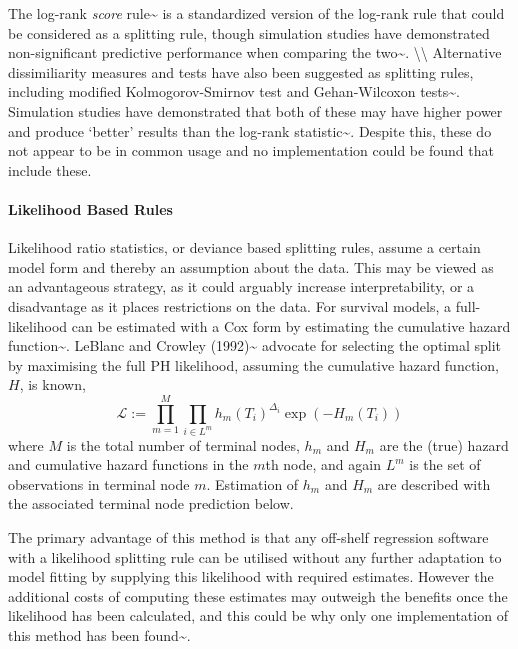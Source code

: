 \documentclass[
  letterpaper,
]{scrbook}
\let\oldparagraph\paragraph
\renewcommand{\paragraph}[1]{\oldparagraph{#1}\mbox{}}
\theoremstyle{plain}
\theoremstyle{definition}
\theoremstyle{remark}
\begin{document}
The log-rank \emph{score} rule\textasciitilde{}\cite{Hothorn2003} is a
standardized version of the log-rank rule that could be considered as a
splitting rule, though simulation studies have demonstrated
non-significant predictive performance when comparing the
two\textasciitilde{}\cite{Ishwaran2008}. \textbackslash\textbackslash{}
Alternative dissimiliarity measures and tests have also been suggested
as splitting rules, including modified Kolmogorov-Smirnov test and
Gehan-Wilcoxon tests\textasciitilde{}\cite{Ciampi1988}. Simulation
studies have demonstrated that both of these may have higher power and
produce `better' results than the log-rank
statistic\textasciitilde{}\cite{Fleming1980}. Despite this, these do not
appear to be in common usage and no implementation could be found that
include these.

\noindent 

\paragraph{Likelihood Based Rules}

Likelihood ratio statistics, or deviance based splitting rules, assume a
certain model form and thereby an assumption about the data. This may be
viewed as an advantageous strategy, as it could arguably increase
interpretability, or a disadvantage as it places restrictions on the
data. For survival models, a full-likelihood can be estimated with a Cox
form by estimating the cumulative hazard
function\textasciitilde{}\cite{LeBlanc1992}. LeBlanc and Crowley
(1992)\textasciitilde{}\cite{LeBlanc1992} advocate for selecting the
optimal split by maximising the full PH likelihood, assuming the
cumulative hazard function, \(H\), is known, \[
\mathcal{L}:= \prod_{m = 1}^M \prod_{i \in L^m} h_m(T_i)^{\Delta_i} \exp(-H_m(T_i))
\] where \(M\) is the total number of terminal nodes, \(h_m\) and
\(H_m\) are the (true) hazard and cumulative hazard functions in the
\(m\)th node, and again \(L^m\) is the set of observations in terminal
node \(m\). Estimation of \(h_m\) and \(H_m\) are described with the
associated terminal node prediction below.

The primary advantage of this method is that any off-shelf regression
software with a likelihood splitting rule can be utilised without any
further adaptation to model fitting by supplying this likelihood with
required estimates. However the additional costs of computing these
estimates may outweigh the benefits once the likelihood has been
calculated, and this could be why only one implementation of this method
has been found\textasciitilde{}\cite{Bou-Hamad2011, pkgrpart}.
\end{document}
